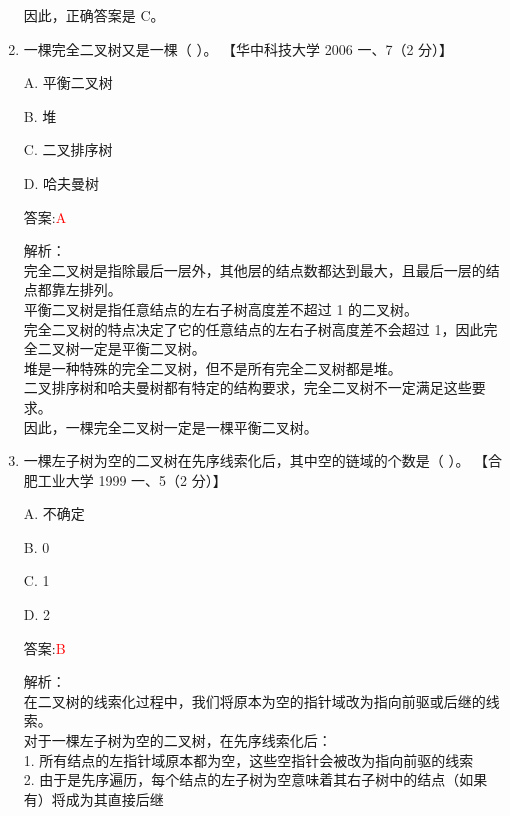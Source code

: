 \documentclass[lang=cn,newtx,10pt,scheme=chinese]{../../../elegantbook}
\begin{document}
\begin{enumerate}
    因此，正确答案是 C。\\  

    \item 一棵完全二叉树又是一棵（ ）。  
    【华中科技大学 2006 一、7（2 分）】  

    A. 平衡二叉树  

    B. 堆  

    C. 二叉排序树  

    D. 哈夫曼树  

    答案:\textcolor{red}{A}
    
    解析：\\
    完全二叉树是指除最后一层外，其他层的结点数都达到最大，且最后一层的结点都靠左排列。\\
    
    平衡二叉树是指任意结点的左右子树高度差不超过 1 的二叉树。\\
    
    完全二叉树的特点决定了它的任意结点的左右子树高度差不会超过 1，因此完全二叉树一定是平衡二叉树。\\
    
    堆是一种特殊的完全二叉树，但不是所有完全二叉树都是堆。\\
    
    二叉排序树和哈夫曼树都有特定的结构要求，完全二叉树不一定满足这些要求。\\
    
    因此，一棵完全二叉树一定是一棵平衡二叉树。\\  

    \item 一棵左子树为空的二叉树在先序线索化后，其中空的链域的个数是（ ）。  
    【合肥工业大学 1999 一、5（2 分）】 

    A. 不确定  

    B. 0  

    C. 1  

    D. 2  

    答案:\textcolor{red}{B}
    
    解析：\\
    在二叉树的线索化过程中，我们将原本为空的指针域改为指向前驱或后继的线索。\\
    
    对于一棵左子树为空的二叉树，在先序线索化后：\\
    1. 所有结点的左指针域原本都为空，这些空指针会被改为指向前驱的线索\\
    2. 由于是先序遍历，每个结点的左子树为空意味着其右子树中的结点（如果有）将成为其直接后继\\
    

\end{enumerate}
\end{document}
